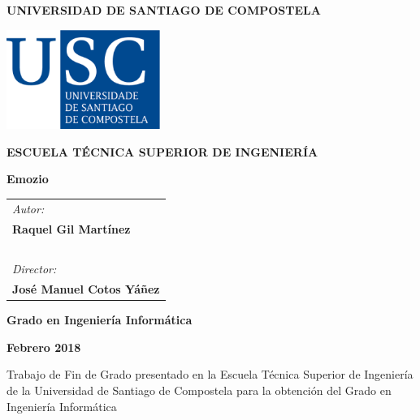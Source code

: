 \pagestyle{empty}
\begin{center}
{\bf\Large UNIVERSIDAD DE SANTIAGO DE COMPOSTELA}

\vspace{0.5cm}
\includegraphics[width=5cm]{figuras/logo_usc.eps}

\vspace{0.5cm}
{\bf\large ESCUELA TÉCNICA SUPERIOR DE INGENIERÍA}

\vspace{2cm}
{\bf\LARGE Emozio}

\vspace{0.5cm}
\end{center}

\vspace{2cm}
\hspace{4cm}\begin{tabular}{l}
{\it\Large Autor:} \\
{\bf\Large Raquel Gil Martínez} \\
~ \\
{\it\Large Director:} \\
{\bf\Large José Manuel Cotos Yáñez} \\
\end{tabular}

\vspace{2cm}
\begin{center}
{\bf\Large Grado en Ingeniería Informática}

\vspace{0.5cm}
{\bf\large Febrero 2018}

\vspace{0.5cm}
Trabajo de Fin de Grado presentado en la Escuela Técnica Superior de Ingeniería de la Universidad de Santiago de Compostela para la obtención del Grado en Ingeniería Informática
\end{center}

